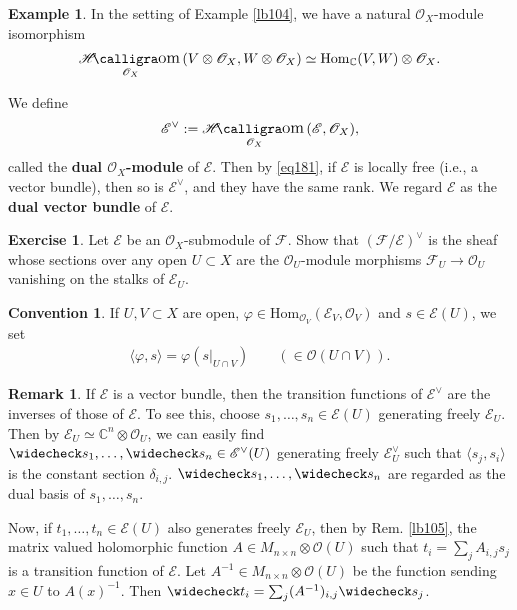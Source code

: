 \documentclass[12pt,a4paper,notitlepage]{article}
\theoremstyle{definition}
\newtheorem{eg}[df]{Example}
\newtheorem{exe}[df]{Exercise}
\newtheorem{rem}[df]{Remark}
\newtheorem{cv}[df]{Convention}
\theoremstyle{plain}
\DeclareMathOperator{\shom}{\mathscr{H}\text{\kern -3pt {\calligra\large om}}\,}
\newcommand{\wch}{\widecheck}
\newcommand{\Hom}{\mathrm{Hom}}
\newcommand{\bk}[1]{\langle {#1}\rangle}
\newcommand{\scr}{\mathscr}
\newcommand{\Cbb}{\mathbb C}
\numberwithin{equation}{section}
\begin{document}
\begin{eg}
	In the setting of Example \ref{lb104}, we have a natural $\scr O_X$-module isomorphism
	\begin{align}
		\shom_{\scr O_X}(V\otimes\scr O_X,W\otimes\scr O_X)\simeq \Hom_\Cbb(V,W)\otimes\scr O_X.	\label{eq181}
	\end{align}
\end{eg}

We define
\begin{align*}
	\scr E^\vee:=\shom_{\scr O_X}(\scr E,\scr O_X),
\end{align*}
called the \textbf{dual $\scr O_X$-module} of $\scr E$. Then by \eqref{eq181}, if $\scr E$ is locally free (i.e., a vector bundle), then so is $\scr E^\vee$, and they have the same rank. We regard $\scr E$ as the \textbf{dual vector bundle} of $\scr E$.


\begin{exe}
Let $\scr E$ be an $\scr O_X$-submodule of $\scr F$. Show that $(\scr F/\scr E)^\vee$ is the sheaf whose sections over any open  $U\subset X$ are the $\scr O_U$-module morphisms $\scr F_U\rightarrow\scr O_U$ vanishing on the stalks of $\scr E_U$.
\end{exe}

\begin{cv}
If $U,V\subset X$ are open, $\varphi\in\Hom_{\scr O_V}(\scr E_V,\scr O_V)$ and $s\in\scr E(U)$, we set
\begin{align*}
\bk{\varphi,s}=\varphi(s|_{U\cap V})\qquad (\in\scr O(U\cap V)).	
\end{align*} 
\end{cv}


\begin{rem}
If $\scr E$ is a vector bundle, then the transition functions of $\scr E^\vee$ are the inverses of those of $\scr E$. To see this, choose $s_1,\dots,s_n\in\scr E(U)$ generating freely $\scr E_U$. Then by $\scr E_U\simeq\Cbb^n\otimes\scr O_U$, we can easily find $\wch s_1,\dots,\wch s_n\in\scr E^\vee(U)$ generating freely $\scr E^\vee_U$ such that $\bk{s_j,s_i}$ is the constant section $\delta_{i,j}$. $\wch s_1,\dots,\wch s_n$ are regarded as the dual basis of  $s_1,\dots,s_n$. 

Now, if $t_1,\dots,t_n\in\scr E(U)$ also generates freely $\scr E_U$, then by Rem. \ref{lb105}, the matrix valued holomorphic function $A\in M_{n\times n}\otimes\scr O(U)$ such that $t_i=\sum_j A_{i,j}s_j$ is a transition function of $\scr E$. Let $A^{-1}\in M_{n\times n}\otimes\scr O(U)$ be the function sending $x\in U$ to $A(x)^{-1}$. Then $\wch t_i=\sum_j (A^{-1})_{i,j}\wch s_j$. \hfill\qedsymbol
\end{rem}
\end{document}
